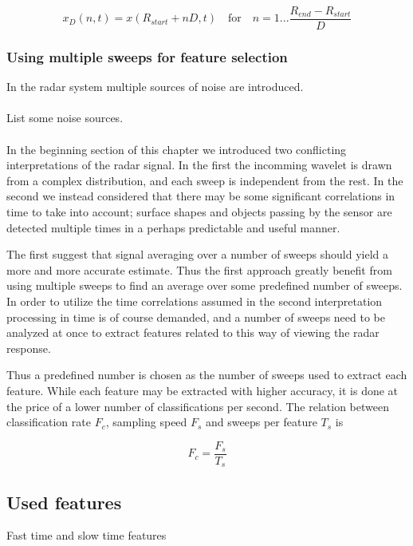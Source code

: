 \documentclass[a4paper, 12pt]{article}
\begin{document}
\begin{equation}
	x_D(n, t) = x(R_{start} + nD, t) \quad \text{for}\quad n=1...\frac{R_{end}-R_{start}}{D}
\end{equation}

\subsubsection{Using multiple sweeps for feature selection}

In the radar system multiple sources of noise are introduced.
\\ \\
List some noise sources.
\\ \\
In the beginning section of this chapter we introduced two conflicting interpretations of the radar signal. In the first the incomming wavelet is drawn from a complex distribution, and each sweep is independent from the rest. In the second we instead considered that there may be some significant correlations in time to take into account; surface shapes and objects passing by the sensor are detected multiple times in a perhaps predictable and useful manner.  

The first suggest that signal averaging over a number of sweeps should yield a more and more accurate estimate. Thus the first approach greatly benefit from using multiple sweeps to find an average over some predefined number of sweeps.  In order to utilize the time correlations assumed in the second interpretation processing in time is of course demanded, and a number of sweeps need to be analyzed at once to extract features related to this way of viewing the radar response. 

Thus a predefined number is chosen as the number of sweeps used to extract each feature. While each feature may be extracted with higher accuracy, it is done at the price of a lower number of classifications per second. The relation between classification rate $F_c$, sampling speed $F_s$ and sweeps per feature $T_s$ is

\begin{equation}
	F_c = \frac{F_s}{T_s}
\end{equation}

\subsection{Used features}

Fast time and slow time features 
\end{document}
